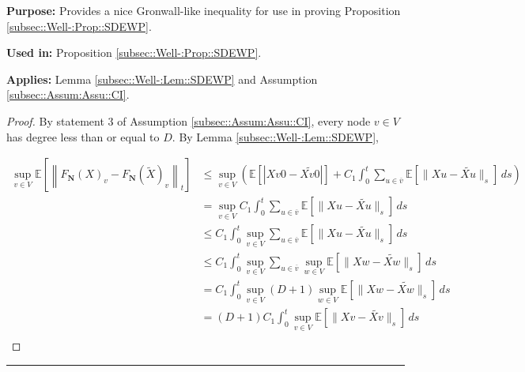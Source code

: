 \documentclass[12pt]{article}
\newcommand{\mb}{\mathbb}
\newcommand{\ov}{\overline}
\newcommand{\purpose}{\textbf{Purpose: }}
\newcommand{\usein}{\textbf{Used in: }}
\newcommand{\app}{\textbf{Applies: }}
\newcommand{\lin}{\rule{\linewidth}{0.4 pt}}
\newcommand{\ex}[1]{\mb{E}\left[#1\right]}			%
\renewcommand{\v}{v}							%
\newcommand{\vv}{u}								%
\newcommand{\vvv}{w}							%
\renewcommand{\t}{t}							%
\renewcommand{\tt}{s}							%
\newcommand{\X}{X}								%
\newcommand{\cl}{\ov}							%
\newcommand{\degr}{D}								%
\newcommand{\poisses}{\mathbf{N}}				%
\newcommand{\V}{V}									%
\newcommand{\const}[1]{C_{#1}}						%
\newcommand{\alt}{\widetilde}						%
\begin{document}
\purpose Provides a nice Gronwall-like inequality for use in proving Proposition \ref{subsec::Well-:Prop::SDEWP}.

\usein Proposition \ref{subsec::Well-:Prop::SDEWP}.

\app Lemma \ref{subsec::Well-:Lem::SDEWP} and Assumption \ref{subsec::Assum:Assu::CI}.

\begin{proof}
By statement 3 of Assumption \ref{subsec::Assum:Assu::CI}, every node \(v \in V\) has degree less than or equal to \(\degr\). By Lemma \ref{subsec::Well-:Lem::SDEWP},

\begin{align*}
\sup_{\v \in \V} \ex{\left\|F_\poisses(\X{}{})_\v - F_\poisses(\alt{\X{}{}})_\v\right\|_\t} &\leq \sup_{\v\in \V}\left(\ex{|\X{\v}{0} - \alt{\X{\v}{0}}|} +  \const{1}\int_0^\t \sum_{\vv\in \cl{\v}} \ex{\|\X{\vv} - \alt{\X{\vv}{}}\|_\tt}\,d\tt\right)\\
&=\sup_{\v \in \V} \const{1}\int_0^\t \sum_{\vv \in \cl{\v}} \ex{\|\X{\vv} - \alt{\X{\vv}{}}\|_\tt}\,d\tt\\
&\leq \const{1}\int_0^\t \sup_{\v \in \V}\sum_{\vv \in \cl{\v}} \ex{\|\X{\vv} - \alt{\X{\vv}{}}\|_\tt}\,d\tt\\
&\leq \const{1}\int_0^\t \sup_{\v \in \V}\sum_{\vv \in \cl{\v}}\sup_{\vvv\in\V} \ex{\|\X{\vvv} - \alt{\X{\vvv}{}}\|_\tt}\,d\tt\\
&= \const{1}\int_0^\t \sup_{\v \in \V}(\degr+1)\sup_{\vvv\in\V} \ex{\|\X{\vvv} - \alt{\X{\vvv}{}}\|_\tt}\,d\tt\\
&= (\degr+1)\const{1}\int_0^\t \sup_{\v\in\V} \ex{\|\X{\v} - \alt{\X{\v}{}}\|_\tt}\,d\tt\\
\end{align*}
\end{proof}
\lin
\end{document}
